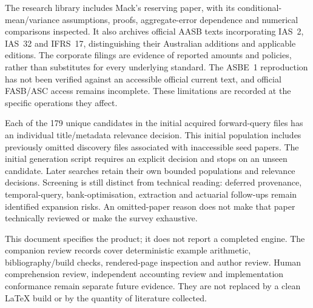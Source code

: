 The research library includes Mack's reserving paper, with its conditional-mean/variance
assumptions, proofs, aggregate-error dependence and numerical comparisons
inspected. It also archives official AASB texts incorporating IAS~2, IAS~32
and IFRS~17, distinguishing their Australian additions and applicable editions.
The corporate filings are evidence of reported amounts and policies, rather
than substitutes for every underlying standard. The ASBE~1 reproduction has
not been verified against an accessible official current text, and official
FASB/ASC access remains incomplete. These limitations are recorded at the
specific operations they affect.

Each of the 179 unique candidates in the initial acquired forward-query
files has an individual title/metadata relevance decision. This initial
population includes previously omitted discovery files associated with
inaccessible seed papers. The initial generation script requires an explicit
decision and stops on an unseen candidate. Later searches retain their own
bounded populations and relevance decisions. Screening is still distinct from technical reading: deferred
provenance, temporal-query, bank-optimisation, extraction and actuarial
follow-ups remain identified expansion risks. An omitted-paper reason does
not make that paper technically reviewed or make the survey exhaustive.

This document specifies the product; it does not report a completed engine.
The companion review records cover deterministic example arithmetic,
bibliography/build checks, rendered-page inspection and author review. Human
comprehension review, independent accounting review and implementation
conformance remain separate future evidence. They are not replaced by a clean
LaTeX build or by the quantity of literature collected.
